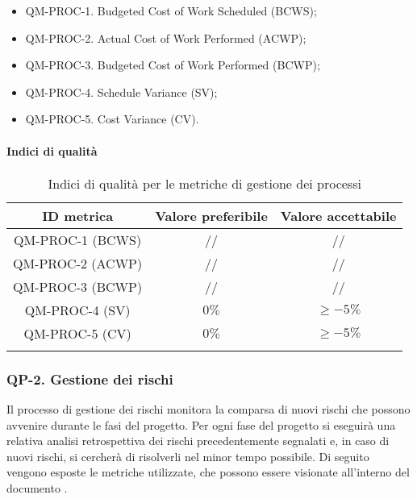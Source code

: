 			\begin{itemize}
				\item QM-PROC-1. Budgeted Cost of Work Scheduled (BCWS);
				\item QM-PROC-2. Actual Cost of Work Performed (ACWP);
				\item QM-PROC-3. Budgeted Cost of Work Performed (BCWP);
				\item QM-PROC-4. Schedule Variance (SV);
				\item QM-PROC-5. Cost Variance (CV).
			\end{itemize}

		\paragraph{Indici di qualità}

			\begin{center}
				\begin{longtable}{|c|c|c|}
				\hline
				\rowcolor{lighter-grayer}
				\textbf{ID metrica} & \textbf{Valore preferibile} & \textbf{Valore accettabile}\\
				\hline
				\endfirsthead
				\hline
				QM-PROC-1 (BCWS) & // & // \\
				\hline
				QM-PROC-2 (ACWP) & // & // \\
				\hline
				QM-PROC-3 (BCWP) & // & // \\
				\hline
				QM-PROC-4 (SV) & \(0\%\) & \(\ge -5\%\) \\
				\hline
				QM-PROC-5 (CV) & \(0\%\) & \(\ge -5\%\) \\
				\hline
				\caption{Indici di qualità per le metriche di gestione dei processi}
				\end{longtable}
			\end{center}

	\subsubsection{QP-2. Gestione dei rischi}

		Il processo di gestione dei rischi monitora la comparsa di nuovi rischi che possono avvenire durante le fasi del progetto.
		Per ogni fase del progetto si eseguirà una relativa analisi retrospettiva dei rischi precedentemente segnalati e, in caso di nuovi rischi, si cercherà di risolverli nel minor tempo possibile.
		Di seguito vengono esposte le metriche utilizzate, che possono essere visionate all'interno del documento .

